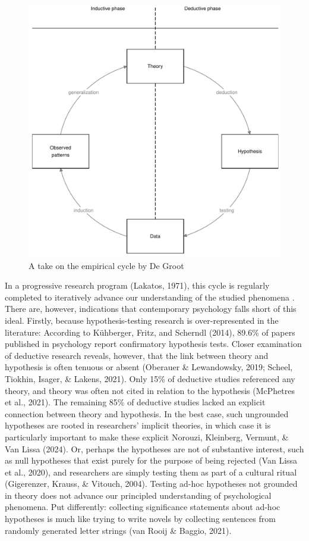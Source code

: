\documentclass[
  man,floatsintext]{apa6}
\begin{document}
\begin{figure}
\centering
\includegraphics{empirical_cycle.pdf}
\caption{\label{fig:figec}A take on the empirical cycle by De Groot}
\end{figure}

In a progressive research program (Lakatos, 1971),
this cycle is regularly completed to iteratively advance our understanding of the studied phenomena
.
There are, however, indications that contemporary psychology falls short of this ideal.
Firstly, because hypothesis-testing research is over-represented in the literature:
According to Kühberger, Fritz, and Scherndl (2014), 89.6\% of papers published in psychology report confirmatory hypothesis tests.
Closer examination of deductive research reveals, however, that the link between theory and hypothesis is often tenuous or absent (Oberauer \& Lewandowsky, 2019; Scheel, Tiokhin, Isager, \& Lakens, 2021).
Only 15\% of deductive studies referenced any theory, and theory was often not cited in relation to the hypothesis (McPhetres et al., 2021).
The remaining 85\% of deductive studies lacked an explicit connection between theory and hypothesis.
In the best case, such ungrounded hypotheses are rooted in researchers' implicit theories, in which case it is particularly important to make these explicit Norouzi, Kleinberg, Vermunt, \& Van Lissa (2024).
Or, perhaps the hypotheses are not of substantive interest, such as null hypotheses that exist purely for the purpose of being rejected (Van Lissa et al., 2020), and researchers are simply testing them as part of a cultural ritual (Gigerenzer, Krauss, \& Vitouch, 2004).
Testing ad-hoc hypotheses not grounded in theory does not advance our principled understanding of psychological phenomena.
Put differently: collecting significance statements about ad-hoc hypotheses is much like trying to write novels by collecting sentences from randomly generated letter strings (van Rooij \& Baggio, 2021).
\end{document}
